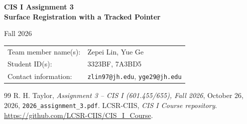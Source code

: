 \documentclass[11pt]{article}
\begin{document}
\hypersetup{pageanchor=false}
\begin{titlepage}
\centering
\vspace*{1.5cm}
{\LARGE\bfseries CIS I Assignment 3\\[0.4cm]
Surface Registration with a Tracked Pointer\par}
\vspace{1.5cm}
{\large Fall 2026\par}
\vfill
\begin{tabular}{p{}p{}}
Team member name(s): & Zepei Lin, Yue Ge \\[0.8cm]
Student ID(s): & 3323BF, 7A3BD5 \\[0.8cm]
Contact information: & \texttt{zlin97@jh.edu}, \texttt{yge29@jh.edu}
\end{tabular}
\vfill
\noindent{}
\vfill
\end{titlepage}
\hypersetup{pageanchor=true}

\tableofcontents
\clearpage











\clearpage
\begingroup
\raggedright
\begin{thebibliography}{99}
 R. H. Taylor, \emph{Assignment 3 -- CIS I (601.455/655), Fall 2026}, October 26, 2026, \texttt{2026\_assignment\_3.pdf}.
 LCSR-CIIS, \emph{CIS I Course repository}.
\url{https://github.com/LCSR-CIIS/CIS_I_Course}.
\end{thebibliography}
\endgroup
\end{document}
